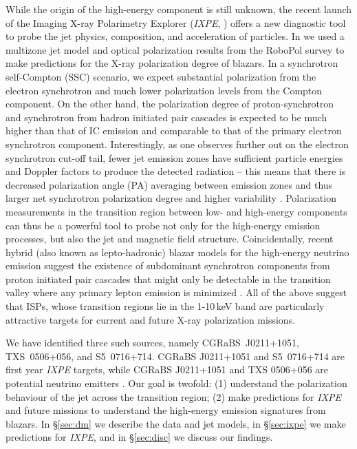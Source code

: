 While the origin of the high-energy component is still unknown, the recent launch of the Imaging X-ray Polarimetry Explorer ({\it IXPE}, \citealp{weisskopf_imaging_2022}) offers a new diagnostic tool to probe the jet physics, composition, and acceleration of particles. In \citet{liodakis_prospects_2019} we used a multizone jet model \citep{marscher_turbulent_2014,peirson_polarization_2018,peirson_polarization_2019} and optical polarization results from the RoboPol survey \citep{blinov_robopol_2021} to make predictions for the X-ray polarization degree of blazars.  In a synchrotron self-Compton (SSC) scenario, we expect substantial polarization from the electron synchrotron and much lower polarization levels from the Compton component. On the other hand, the polarization degree of proton-synchrotron and synchrotron from hadron initiated pair cascades is expected to be much higher than that of IC emission and comparable to that of the primary electron synchrotron component. Interestingly, as one observes further out on the electron synchrotron cut-off tail, fewer jet emission zones have sufficient particle energies and Doppler factors to produce the detected radiation -- this means that there is decreased polarization angle (PA) averaging between emission zones and thus larger net synchrotron polarization degree and higher variability \citep{peirson_polarization_2018,peirson_polarization_2019}. Polarization measurements in the transition region between low- and high-energy components can thus be a powerful tool to probe not only for the high-energy emission processes, but also the jet and magnetic field structure. Coincidentally, recent hybrid (also known as lepto-hadronic) blazar models for the high-energy neutrino emission suggest the existence of subdominant synchrotron components from proton initiated pair cascades that might only be detectable in the transition valley where any primary lepton emission is minimized \cite[e.g.,][]{gao_modelling_2019}. All of the above suggest that ISPs, whose transition regions lie in the  1-10\,keV band are particularly attractive targets for current and future X-ray polarization missions.

We have identified three such sources, namely CGRaBS~J0211+1051, TXS~0506+056, and S5~0716+714. CGRaBS J0211+1051 and S5~0716+714 are first year {\it IXPE} targets, while  CGRaBS J0211+1051 and TXS 0506+056 are potential neutrino emitters \citep{icecube_multi-messenger_2018,hovatta_association_2021}. Our goal is twofold: (1) understand the polarization behaviour of the jet across the transition region; (2) make predictions for {\it IXPE} and future missions to understand the high-energy emission signatures from blazars. In \S\ref{sec:dm} we describe the data and jet models, in \S\ref{sec:ixpe} we make predictions for {\it IXPE}, and in \S\ref{sec:disc} we discuss our findings.

